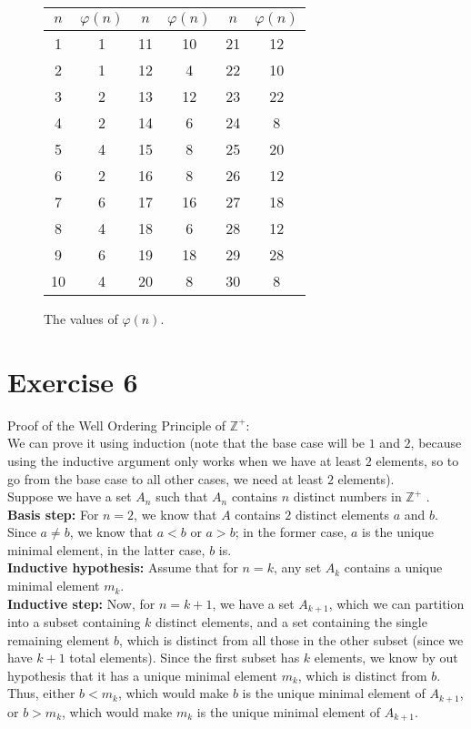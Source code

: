 \documentclass[12pt]{article}
\newcommand{\Z}{\mathbb{Z}}
\begin{document}
    \begin{figure}[H]
        \centering

        \begin{tabular}{|*{6}{c|}}
            \hline
            \( n \) & \( \varphi(n) \) & \( n \) & \( \varphi(n) \) 
            & \( n \) & \( \varphi(n) \) \\
            \hline
            1 & 1 & 11 & 10 & 21 & 12 \\
            2 & 1 & 12 & 4 & 22 & 10 \\
            3 & 2 & 13 & 12 & 23 & 22 \\
            4 & 2 & 14 & 6 & 24 & 8 \\
            5 & 4 & 15 & 8 & 25 & 20 \\
            6 & 2 & 16 & 8 & 26 & 12 \\
            7 & 6 & 17 & 16 & 27 & 18 \\
            8 & 4 & 18 & 6 & 28 & 12 \\
            9 & 6 & 19 & 18 & 29 & 28 \\
            10 & 4 & 20 & 8 & 30 & 8 \\
            \hline
        \end{tabular}
        \caption{\label{fig:figure1} The values of $\varphi(n)$.}
    \end{figure}
    
    \section*{Exercise 6}
    Proof of the Well Ordering Principle of $\Z^+$: \\
    We can prove it using induction
    (note that the base case will be $1$ and $2$,
    because using the inductive argument only works
    when we have at least $2$ elements,
    so to go from the base case to all other cases,
    we need at least $2$ elements). \\
    Suppose we have a set $A_n$
    such that $A_n$ contains $n$ distinct numbers in $\Z^+$ . \\
    \textbf{Basis step:}
    For $n = 2$,
    we know that $A$ contains $2$ distinct elements $a$ and $b$.
    Since $a \neq b$,
    we know that $a < b$ or $a > b$;
    in the former case, $a$ is the unique minimal element,
    in the latter case, $b$ is. \\
    \textbf{Inductive hypothesis:}
    Assume that for $n = k$,
    any set $A_k$ contains a unique minimal element $m_k$. \\
    \textbf{Inductive step:} 
    Now, for $n = k+1$,
    we have a set $A_{k+1}$,
    which we can partition into a subset containing
    $k$ distinct elements,
    and a set containing the single remaining element $b$,
    which is distinct from all those in the other subset
    (since we have $k+1$ total elements).
    Since the first subset has $k$ elements,
    we know by out hypothesis that it has
    a unique minimal element $m_k$,
    which is distinct from $b$.
    Thus, either $b < m_k$,
    which would make $b$ is the unique minimal element of $A_{k+1}$,
    or $b > m_k$,
    which would make $m_k$ is the unique minimal element of $A_{k+1}$. \\
\end{document}
